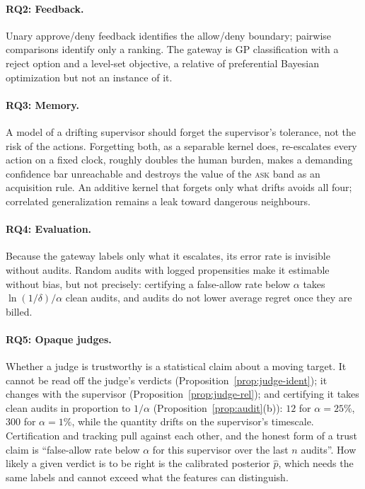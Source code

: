 \documentclass[11pt]{article}
\newcommand{\RQ}[1]{\textbf{RQ#1}}
\begin{document}
\paragraph{\RQ2: Feedback.} Unary approve/deny feedback identifies the
allow/deny boundary; pairwise comparisons identify only a ranking. The gateway
is GP classification with a reject option and a level-set objective, a
relative of preferential Bayesian optimization but not an instance of it.

\paragraph{\RQ3: Memory.} A model of a drifting supervisor should forget the
supervisor's tolerance, not the risk of the actions. Forgetting both, as a
separable kernel does, re-escalates every action on a fixed clock, roughly
doubles the human burden, makes a demanding confidence bar unreachable and
destroys the value of the \textsc{ask} band as an acquisition rule. An
additive kernel that forgets only what drifts avoids all four; correlated
generalization remains a leak toward dangerous neighbours.

\paragraph{\RQ4: Evaluation.} Because the gateway labels only what it
escalates, its error rate is invisible without audits. Random audits with
logged propensities make it estimable without bias, but not precisely:
certifying a false-allow rate below $\alpha$ takes $\ln(1/\delta)/\alpha$
clean audits, and audits do not lower average regret once they are billed.

\paragraph{\RQ5: Opaque judges.} Whether a judge is trustworthy is a
statistical claim about a moving target. It cannot be read off the judge's
verdicts (Proposition~\ref{prop:judge-ident}); it changes with the supervisor
(Proposition~\ref{prop:judge-rel}); and certifying it takes clean audits in
proportion to $1/\alpha$ (Proposition~\ref{prop:audit}(b)): $12$ for
$\alpha = 25\%$, $300$ for $\alpha = 1\%$, while the quantity drifts on the
supervisor's timescale. Certification and tracking pull against each other,
and the honest form of a trust claim is ``false-allow rate below $\alpha$ for
this supervisor over the last $n$ audits''. How likely a given verdict is to
be right is the calibrated posterior $\hat p$, which needs the same labels and
cannot exceed what the features can distinguish.
\end{document}
